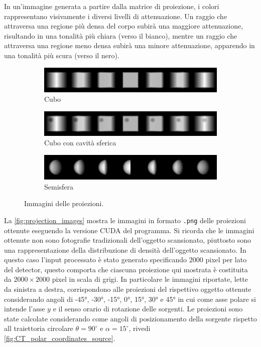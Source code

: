 \documentclass[12pt,a4paper]{report}
\begin{document}
In un'immagine generata a partire dalla matrice di proiezione, i colori rappresentano visivamente i diversi livelli di
attenuazione.
Un raggio che attraversa una regione più densa del corpo subirà una maggiore attenuazione, risultando in una tonalità più chiara
(verso il bianco), mentre un raggio che attraversa una regione meno densa subirà una minore attenuazione, apparendo in una
tonalità più scura (verso il nero).

\begin{figure}[H]
  \centering
  \begin{subfigure}{0.9\textwidth}
    \centering
    \includegraphics[width=\textwidth]{Cube}
    \caption{Cubo}
  \end{subfigure}
  \begin{subfigure}{0.9\textwidth}
    \centering
    \includegraphics[width=\textwidth]{CubeWithSphericalHole}
    \caption{Cubo con cavità sferica}
  \end{subfigure}
  \begin{subfigure}{0.9\textwidth}
    \centering
    \includegraphics[width=\textwidth]{HalfSphere}
    \caption{Semisfera}
  \end{subfigure}
  \caption{\label{fig:projection_images} Immagini delle proiezioni.}
\end{figure}

La \autoref{fig:projection_images} mostra le immagini in formato \lstinline{.png} delle proiezioni ottenute eseguendo la versione
CUDA del programma.
Si ricorda che le immagini ottenute non sono fotografie tradizionali dell'oggetto scansionato, piuttosto sono una rappresentazione
della distribuzione di densità dell'oggetto scansionato.
In questo caso l'input processato è stato generato specificando \(2000\) pixel per lato del detector, questo comporta che
ciascuna proiezione qui mostrata è costituita da \(2000 \times 2000\) pixel in scala di grigi.
In particolare le immagini riportate, lette da sinistra a destra, corrispondono alle proiezioni del rispettivo oggetto ottenute
considerando angoli di -45°, -30°, -15°, 0°, 15°, 30° e 45° in cui come asse polare si intende l'asse \(y\) e il senso orario di
rotazione delle sorgenti.
Le proiezioni sono state calcolate considerando come angoli di posizionamento della sorgente rispetto all traiettoria circolare
\(\theta = 90^\circ\) e \(\alpha = 15^\circ\), rivedi \autoref{fig:CT_polar_coordinates_source}.
\end{document}
